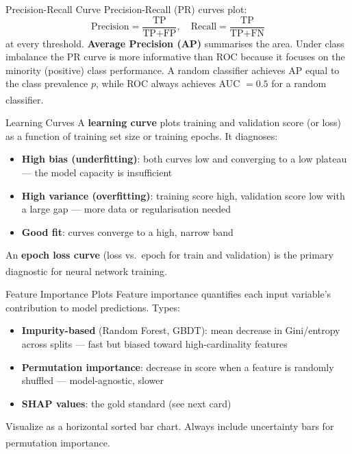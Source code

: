 \begin{v3topic}{Precision-Recall Curve}
    Precision-Recall (PR) curves plot:
    \begin{equation}
        \text{Precision} = \frac{\text{TP}}{\text{TP}+\text{FP}}, \quad
        \text{Recall} = \frac{\text{TP}}{\text{TP}+\text{FN}}
    \end{equation}
    at every threshold. \textbf{Average Precision (AP)} summarises the area.
    Under class imbalance the PR curve is more informative than ROC because it
    focuses on the minority (positive) class performance. A random classifier achieves
    AP equal to the class prevalence $p$, while ROC always achieves AUC $= 0.5$
    for a random
    classifier\textsuperscript{\cite[][pp.~190--195]{raschkaPythonMachineLearning2015}}.

\end{v3topic}
\begin{v3topic}{Learning Curves}
    A \textbf{learning curve} plots training and validation score (or loss) as a
    function of training set size or training epochs. It diagnoses:
    \begin{itemize}
        \item \textbf{High bias (underfitting)}: both curves low and converging to a low
              plateau --- the model capacity is insufficient
        \item \textbf{High variance (overfitting)}: training score high, validation score
              low with a large gap --- more data or regularisation needed
        \item \textbf{Good fit}: curves converge to a high, narrow band
    \end{itemize}
    An \textbf{epoch loss curve} (loss vs.\ epoch for train and validation) is the primary
    diagnostic for neural network
    training\textsuperscript{\cite[][pp.~200--210]{raschkaPythonMachineLearning2015}}.

\end{v3topic}
\begin{v3topic}{Feature Importance Plots}
    Feature importance quantifies each input variable's contribution to model predictions.
    Types:
    \begin{itemize}
        \item \textbf{Impurity-based} (Random Forest, GBDT): mean decrease in Gini/entropy
              across splits --- fast but biased toward high-cardinality features
        \item \textbf{Permutation importance}: decrease in score when a feature is randomly
              shuffled --- model-agnostic, slower
        \item \textbf{SHAP values}: the gold standard (see next card)
    \end{itemize}
    Visualize as a horizontal sorted bar chart. Always include uncertainty bars for
    permutation
    importance\textsuperscript{\cite[][pp.~215--220]{raschkaPythonMachineLearning2015}}.

\end{v3topic}
